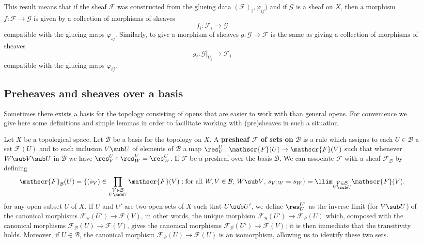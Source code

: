 This result means that if the sheaf $\mathscr{F}$ was constructed from the glueing data $(\mathscr{F})_i,\varphi_{ij})$ and if $\mathscr{G}$ is a sheaf on $X$, then a morphism $f:\mathscr{F}\to\mathscr{G}$ is given by a collection of morphisms of sheaves
\[f_i:\mathscr{F}_i\to\mathscr{G}\]
compatible with the glueing maps $\varphi_{ij}$. Similarly, to give a morphism of sheaves $g:\mathscr{G}\to\mathscr{F}$ is the same as giving a collection of morphisms of sheaves
\[g_i:\mathscr{G}|_{U_i}\to\mathscr{F}_i\]
compatible with the glueing maps $\varphi_{ij}$.
\subsection{Preheaves and sheaves over a basis}
Sometimes there exists a basis for the topology consisting of opens that are easier to work with than general opens. For convenience we give here some definitions and simple lemmas in order to facilitate working with (pre)sheaves in such a situation.\par
Let $X$ be a topological space. Let $\mathcal{B}$ be a basis for the topology on $X$. A \textbf{presheaf $\mathscr{F}$ of sets on $\mathcal{B}$} is a rule which assigns to each $U\in\mathcal{B}$ a set $\mathscr{F}(U)$ and to each inclusion $V\sub U$ of elements of $\mathcal{B}$ a map $\res^U_V:\mathscr{F}(U)\to\mathscr{F}(V)$ such that whenever $W\sub V\sub U$ in $\mathcal{B}$ we have $\res^U_V\circ\res^V_W=\res^U_W$. If $\mathscr{F}$ be a presheaf over the basis $\mathcal{B}$. We can associate $\mathscr{F}$ with a sheaf $\mathscr{F}_{\mathcal{B}}$ by defining
\begin{align}\label{sheaf on basis associate def}
\mathscr{F}_{\mathcal{B}}(U)=\{(s_V)\in\prod_{\substack{V\in\mathcal{B}\\V\sub U}}\mathscr{F}(V):\text{for all $W,V\in\mathcal{B}$, $W\sub V$, $s_V|_{W}=s_{W}$}\}=\llim_{\substack{V\in\mathcal{B}\\V\sub U}}\mathscr{F}(V).
\end{align}
for any open subset $U$ of $X$. If $U$ and $U'$ are two open sets of $X$ such that $U\sub U'$, we define $\res^{U'}_{U}$ as the inverse limit (for $V\sub U$) of the canonical morphisms $\mathscr{F}_{\mathcal{B}}(U')\to\mathscr{F}(V)$, in other words, the unique morphism $\mathscr{F}_{\mathcal{B}}(U')\to\mathscr{F}_{\mathcal{B}}(U)$ which, composed with the canonical morphisms $\mathscr{F}_{\mathcal{B}}(U)\to\mathscr{F}(V)$, gives the canonical morphisms $\mathscr{F}_{\mathcal{B}}(U')\to\mathscr{F}(V)$; it is then immediate that the transitivity holds. Moreover, if $U\in\mathcal{B}$, the canonical morphism $\mathscr{F}_{\mathcal{B}}(U)\to\mathscr{F}(U)$ is an isomorphism, allowing us to identify these two sets.
